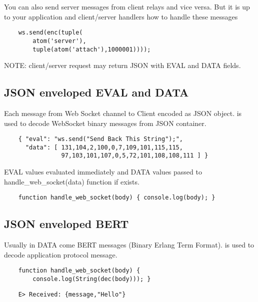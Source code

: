 You can also send server messages from client relays and vice versa.
But it is up to your application and client/server handlers how to handle these messages

\vspace{1\baselineskip}
\begin{lstlisting}
    ws.send(enc(tuple(
        atom('server'),
        tuple(atom('attach'),1000001))));
\end{lstlisting}
\vspace{1\baselineskip}

NOTE: client/server request may return JSON with EVAL and DATA fields.

\subsection*{JSON enveloped EVAL and DATA}

Each message from Web Socket channel to Client encoded as JSON object.
is used to decode WebSocket binary messages from JSON container.

\begin{lstlisting}
    { "eval": "ws.send("Send Back This String");",
      "data": [ 131,104,2,100,0,7,109,101,115,115,
                97,103,101,107,0,5,72,101,108,108,111 ] }
\end{lstlisting}

EVAL values evaluated immediately and DATA values passed
to handle\_web\_socket(data) function if exists.

\begin{lstlisting}
    function handle_web_socket(body) { console.log(body); }
\end{lstlisting}

\subsection*{JSON enveloped BERT}

Usually in DATA come BERT messages (Binary Erlang Term Format).
is used to decode application protocol message.

\begin{lstlisting}
    function handle_web_socket(body) {
        console.log(String(dec(body))); }
\end{lstlisting}

\begin{lstlisting}
    E> Received: {message,"Hello"}
\end{lstlisting}

